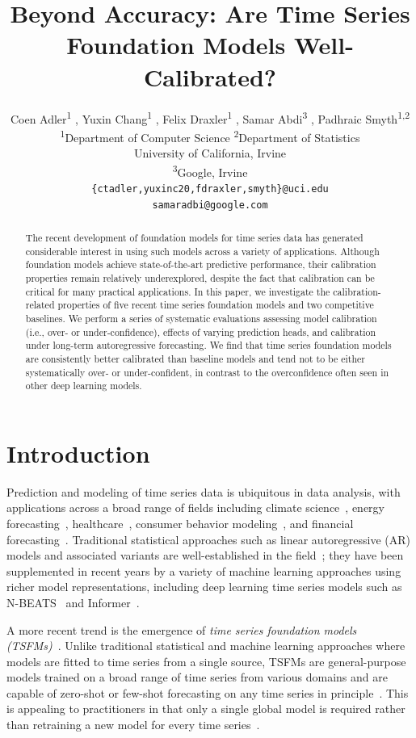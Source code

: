 \documentclass{article}
\title{Beyond Accuracy: Are Time Series Foundation Models Well-Calibrated?}
\author{
\begin{tabular}{c}
\\
Coen Adler\textsuperscript{1} , 
Yuxin Chang\textsuperscript{1} , 
Felix Draxler\textsuperscript{1} , 
Samar Abdi\textsuperscript{3} , 
Padhraic Smyth\textsuperscript{1,2} \\
\mdseries \textsuperscript{1}Department of Computer Science \quad
\mdseries \textsuperscript{2}Department of Statistics \\
\mdseries University of California, Irvine \\
\mdseries \textsuperscript{3}Google, Irvine \\
\mdseries \texttt{\{ctadler,yuxinc20,fdraxler,smyth\}@uci.edu} \\
\mdseries \texttt{samaradbi@google.com} \\
\end{tabular}
}
\begin{document}
\maketitle

\begin{abstract}
The recent development of foundation models for time series data has generated considerable interest in using such models across a variety of applications.
Although foundation  models achieve state-of-the-art predictive performance, their calibration properties remain relatively underexplored, despite the fact that calibration can be critical for many practical applications. 
In this paper, we investigate the calibration-related properties of five recent time series foundation models and two competitive baselines. 
We perform a series of systematic evaluations assessing model calibration (i.e., over- or under-confidence), effects of varying prediction heads, and calibration under long-term autoregressive forecasting.
We find that time series foundation models are consistently better calibrated than baseline models and tend not to be either systematically over- or under-confident, in contrast to the overconfidence often seen in other deep learning models. 
\end{abstract}

\section{Introduction}
\label{intro}

Prediction and modeling of time series data is ubiquitous in data analysis, with applications across a broad range of fields including  climate science~\citep{mudelsee2014climate}, energy forecasting~\citep{deb2017review}, healthcare~\citep{crabtree1990individual}, consumer behavior modeling~\citep{goel2010predicting}, and financial forecasting~\citep{tsay2005analysis}.
Traditional statistical approaches such as linear autoregressive (AR) models and associated variants are well-established in the field~\citep{hamilton1994time,forecasttextbook}; they have been supplemented in recent years by a variety of machine learning approaches using richer model representations, including deep learning time series models such as N-BEATS~\citep{nbeats} and Informer~\citep{zhou2021informer}.

A more recent trend is the emergence of \textit{time series foundation models (TSFMs)}~\citep{patchtst,timeseriesfmtutorial}.
Unlike traditional statistical and machine learning approaches where models are fitted to time series from a single source, TSFMs are general-purpose models trained on a broad range of time series from various domains and are capable of zero-shot or few-shot forecasting on any time series in principle~\citep{timeseriesfmsurvery,timeseriesfmtutorial}. 
This is appealing to practitioners in that only a single global model is required rather than retraining a new model for every time series~\citep{opportunitiesfm,benidis2022deep}.
\end{document}
